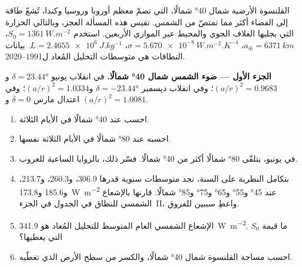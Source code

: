 \begin{problem}
\label{pb:b1:radiation-heat-transport:1}
القلنسوة الأرضية شمال \ang{40} شمالًا، التي تضمّ معظم أوروبا وروسيا وكندا، تُشعّ طاقة إلى الفضاء أكثر مما تمتصّ من الشمس. تقيس هذه المسألة العجز، وبالتالي الحرارة التي يجلبها الغلاف الجوي والمحيط عبر الموازي الأربعين. استخدم $S_0 = \qty{1361}{W.m^{-2}}$،
$a_\oplus = \qty{6371}{km}$، $\sigma = \qty{5.670e-8}{W.m^{-2}.K^{-4}}$، $L =
\qty{2.4655e6}{J.kg^{-1}}$. بيانات النطاقات هي متوسطات التحليل المُعاد ل\num{1991}--2020.

\medskip
\noindent\textbf{الجزء الأول --- ضوء الشمس شمال \ang{40} شمالًا.} في انقلاب يونيو
$\delta = \ang{23.44}$ و$(a/r)^2 = 0.9683$؛ وفي انقلاب ديسمبر $\delta =
\ang{-23.44}$ و$(a/r)^2 = 1.0334$؛ وفي اعتدال مارس $\delta = 0$ و
$(a/r)^2 = 1.0081$.
\begin{enumerate}
  \item احسب  عند \ang{40} شمالًا في الأيام الثلاثة.
  \item احسبه عند \ang{80} شمالًا في الأيام الثلاثة نفسها.
  \item في يونيو، يتلقّى \ang{80} شمالًا أكثر من \ang{40} شمالًا. فسّر ذلك، بالزوايا الساعية للغروب.
  \item بتكامل النظرية على السنة، نجد متوسطات سنوية قدرها \qty{306.9}{}، و\qty{260.3}{}، و\qty{213.7}{}، و\qty{185.6}{} و\qty{173.8}{W.m^{-2}} عند \ang{45} و\ang{55} و\ang{65} و\ang{75} و\ang{85} شمالًا. قارنها بالإشعاع الشمسي للنطاق في الجدول في الجزء~II، واعطِ سببين للفروق.
  \item الإشعاع الشمسي العام المتوسط للتحليل المُعاد هو \qty{341.9}{W.m^{-2}}. ما قيمة $S_0$ التي يعطيها؟
  \item احسب مساحة القلنسوة شمال \ang{40} شمالًا، والكسر من سطح الأرض الذي تغطّيه.
\end{enumerate}


\end{problem}
